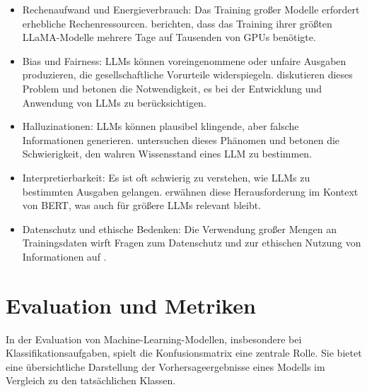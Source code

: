 \begin{itemize}
	\item Rechenaufwand und Energieverbrauch: Das Training großer Modelle erfordert erhebliche Rechenressourcen. \textcite{TouvronHugo2023LOaE} berichten, dass das Training ihrer größten LLaMA-Modelle mehrere Tage auf Tausenden von GPUs benötigte.
	\item Bias und Fairness: \glspl{LLM} können voreingenommene oder unfaire Ausgaben produzieren, die gesellschaftliche Vorurteile widerspiegeln. \textcite{BrownTomB2020LMaF} diskutieren dieses Problem und betonen die Notwendigkeit, es bei der Entwicklung und Anwendung von \glspl{LLM} zu berücksichtigen.
	\item Halluzinationen: \glspl{LLM} können plausibel klingende, aber falsche Informationen generieren. \textcite{JiangZhengbao2020HCWK} untersuchen dieses Phänomen und betonen die Schwierigkeit, den wahren Wissensstand eines \gls{LLM} zu bestimmen.
	\item Interpretierbarkeit: Es ist oft schwierig zu verstehen, wie \glspl{LLM} zu bestimmten Ausgaben gelangen. \textcite{DevlinJacob2019BPoD} erwähnen diese Herausforderung im Kontext von BERT, was auch für größere \glspl{LLM} relevant bleibt.
	\item Datenschutz und ethische Bedenken: Die Verwendung großer Mengen an Trainingsdaten wirft Fragen zum Datenschutz und zur ethischen Nutzung von Informationen auf \parencite{TouvronHugo2023LOaE}.
\end{itemize}

\section{Evaluation und Metriken}
\label{sec:evaluation-metrics}

In der Evaluation von Machine-Learning-Modellen, insbesondere bei Klassifikationsaufgaben, spielt die Konfusionsmatrix eine zentrale Rolle. Sie bietet eine übersichtliche Darstellung der Vorhersageergebnisse eines Modells im Vergleich zu den tatsächlichen Klassen.

